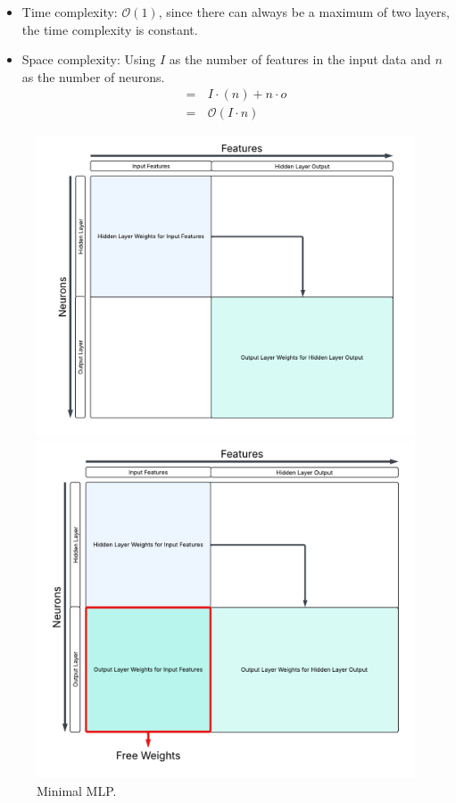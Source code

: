 \begin{itemize}
    \item Time complexity: $\mathcal{O}(1)$, since there can always be a maximum of two layers, the time complexity is constant.
    \item Space complexity: Using $I$ as the number of features in the input data and $n$ as the number of neurons.
    \begin{align*}
    =\, & I \cdot (n) + n \cdot o \\
    =\, & \mathcal{O}(I \cdot n)
    \end{align*}
\end{itemize}

\begin{figure}[h!]
    \centering
    \begin{minipage}[t]{0.48\textwidth}
        \centering
        \includegraphics[width=\textwidth]{Figures/Methodology/Minimal_MLP_Weights.png}
        \caption{Minimal MLP.}
        \label{fig:minMLP}
    \end{minipage}%
    \hfill
    \begin{minipage}[t]{0.46\textwidth}
        \centering
        \includegraphics[width=\textwidth]{Figures/Methodology/Minimal_SPN_Weights.png}

\end{minipage}
\end{figure}
